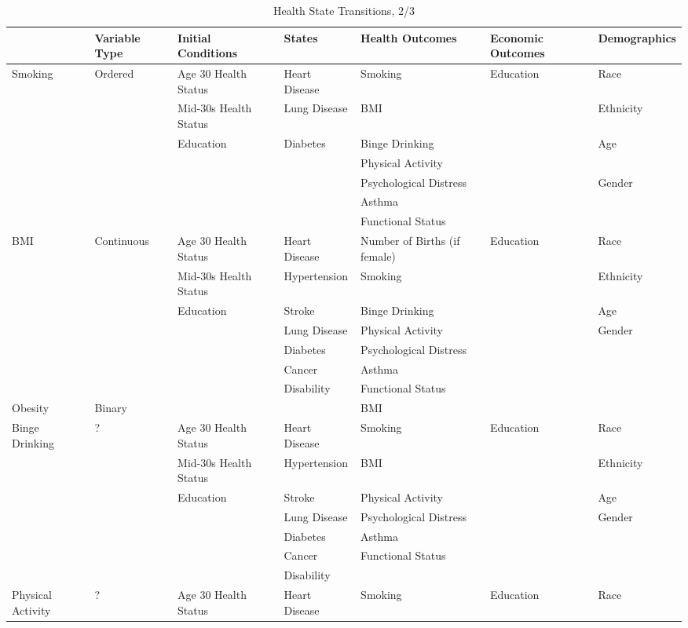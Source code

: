 \begin{table}
\caption{Health State Transitions, 2/3} \label{table:supertab2}
\begin{tiny}
\begin{tabular}{lllllll}
\toprule
& Variable Type & Initial Conditions & States & Health Outcomes & Economic Outcomes & Demographics \\
\midrule
Smoking & Ordered & Age 30 Health Status & Heart Disease & Smoking & Education & Race \\
 & & Mid-30s Health Status & Lung Disease  & BMI & & Ethnicity \\
 &  & Education & Diabetes  & Binge Drinking & & Age \\
 &  & &  & Physical Activity & & \\
   & & & & Psychological Distress & & Gender \\
    & & & & Asthma & & \\
    &  & &  & Functional Status & & \\
\midrule
BMI & Continuous & Age 30 Health Status & Heart Disease & Number of Births (if female) & Education & Race \\
& & Mid-30s Health Status & Hypertension & Smoking & & Ethnicity \\
 & & Education & Stroke & Binge Drinking & & Age \\
 &  & & Lung Disease & Physical Activity & & Gender \\
  &  & & Diabetes & Psychological Distress & & \\
    & & & Cancer & Asthma & & \\
    & & & Disability & Functional Status & & \\
\midrule
Obesity & Binary & & & BMI & & \\
\midrule
Binge Drinking & ? & Age 30 Health Status & Heart Disease & Smoking & Education & Race \\
 & & Mid-30s Health Status & Hypertension & BMI & & Ethnicity \\
  & & Education & Stroke & Physical Activity & & Age \\
  &  & & Lung Disease & Psychological Distress & & Gender \\
   &  & & Diabetes & Asthma & & \\
     & & & Cancer & Functional Status & & \\
     & & & Disability & & & \\
\midrule
Physical Activity & ? & Age 30 Health Status & Heart Disease & Smoking & Education & Race \\

\end{tabular}
\end{tiny}
\end{table}
